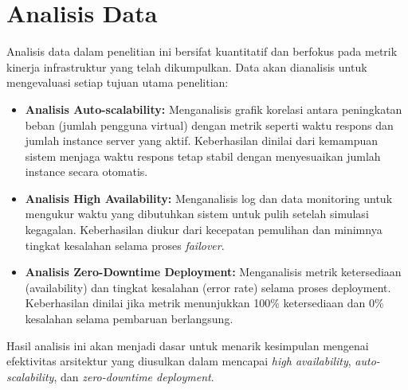\section{Analisis Data}
Analisis data dalam penelitian ini bersifat kuantitatif dan berfokus pada metrik kinerja infrastruktur yang telah dikumpulkan.
Data akan dianalisis untuk mengevaluasi setiap tujuan utama penelitian:
\begin{itemize}
    \item \textbf{Analisis Auto-scalability:} Menganalisis grafik korelasi antara peningkatan beban (jumlah pengguna virtual) dengan metrik seperti waktu respons dan jumlah instance server yang aktif. Keberhasilan dinilai dari kemampuan sistem menjaga waktu respons tetap stabil dengan menyesuaikan jumlah instance secara otomatis.
    \item \textbf{Analisis High Availability:} Menganalisis log dan data monitoring untuk mengukur waktu yang dibutuhkan sistem untuk pulih setelah simulasi kegagalan. Keberhasilan diukur dari kecepatan pemulihan dan minimnya tingkat kesalahan selama proses \textit{failover}.
    \item \textbf{Analisis Zero-Downtime Deployment:} Menganalisis metrik ketersediaan (availability) dan tingkat kesalahan (error rate) selama proses deployment. Keberhasilan dinilai jika metrik menunjukkan 100\% ketersediaan dan 0\% kesalahan selama pembaruan berlangsung.
\end{itemize}
Hasil analisis ini akan menjadi dasar untuk menarik kesimpulan mengenai efektivitas arsitektur yang diusulkan dalam mencapai \textit{high availability}, \textit{auto-scalability}, dan \textit{zero-downtime deployment}.
